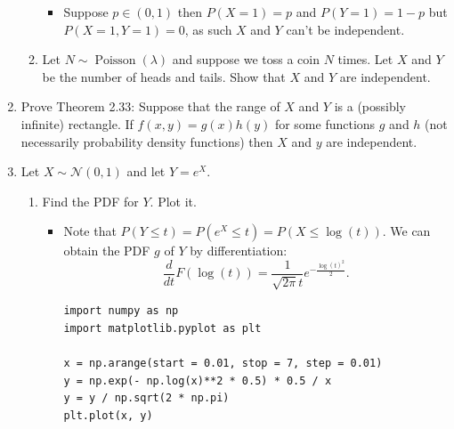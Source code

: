 \documentclass{article}
\begin{document}
\begin{enumerate}
\begin{enumerate}
				\begin{itemize}
					\item Suppose $p \in (0, 1)$ then $P(X = 1) = p$ and $P(Y = 1) = 1 - p$ but $P(X = 1, Y = 1) = 0$, as such $X$ and $Y$ can't be independent.
				\end{itemize}
			\item Let $N \sim \operatorname{Poisson}(\lambda)$ and suppose we toss a coin $N$ times. Let $X$ and $Y$ be the number of heads and tails. Show that $X$ and $Y$ are independent.
		\end{enumerate}
	\item Prove Theorem 2.33: Suppose that the range of $X$ and $Y$ is a (possibly infinite) rectangle. If $f(x, y) = g(x)h(y)$ for some functions $g$ and $h$ (not necessarily probability density functions) then $X$ and $y$ are independent.
	\item Let $X \sim \mathcal{N}(0, 1)$ and let $Y = e^X$.
		\begin{enumerate}
			\item Find the PDF for $Y$. Plot it.
				\begin{itemize}
					\item Note that $P(Y \leq t) = P(e^X \leq t) = P(X \leq \log(t))$. We can obtain the PDF $g$ of $Y$ by differentiation:
					$$
					\frac{d}{dt} F(\log(t)) = \frac{1}{\sqrt{2\pi} t} e^{- \frac{\log(t)^2}{2}}.
					$$
					\begin{verbatim}
import numpy as np
import matplotlib.pyplot as plt

x = np.arange(start = 0.01, stop = 7, step = 0.01)
y = np.exp(- np.log(x)**2 * 0.5) * 0.5 / x
y = y / np.sqrt(2 * np.pi)
plt.plot(x, y)


\end{verbatim}
\end{itemize}
\end{enumerate}
\end{enumerate}
\end{document}
